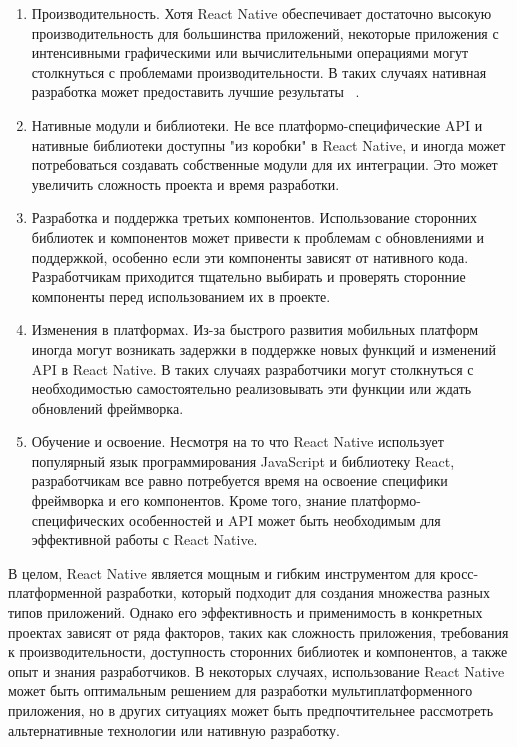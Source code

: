 \documentclass[14pt, russian]{scrartcl}
\begin{document}
\begin{enumerate}
    \item Производительность. Хотя React Native обеспечивает достаточно высокую производительность для большинства приложений, некоторые приложения с интенсивными графическими или вычислительными операциями могут столкнуться с проблемами производительности. В таких случаях нативная разработка может предоставить лучшие результаты ~\cite{Performance}.
    \item Нативные модули и библиотеки. Не все платформо-специфические API и нативные библиотеки доступны "из коробки"{} в React Native, и иногда может потребоваться создавать собственные модули для их интеграции. Это может увеличить сложность проекта и время разработки.
    \item Разработка и поддержка третьих компонентов. Использование сторонних библиотек и компонентов может привести к проблемам с обновлениями и поддержкой, особенно если эти компоненты зависят от нативного кода. Разработчикам приходится тщательно выбирать и проверять сторонние компоненты перед использованием их в проекте.
    \item Изменения в платформах. Из-за быстрого развития мобильных платформ иногда могут возникать задержки в поддержке новых функций и изменений API в React Native. В таких случаях разработчики могут столкнуться с необходимостью самостоятельно реализовывать эти функции или ждать обновлений фреймворка.
    \item Обучение и освоение. Несмотря на то что React Native использует популярный язык программирования JavaScript и библиотеку React, разработчикам все равно потребуется время на освоение специфики фреймворка и его компонентов. Кроме того, знание платформо-специфических особенностей и API может быть необходимым для эффективной работы с React Native.
\end{enumerate}

В целом, React Native является мощным и гибким инструментом для кросс-платформенной разработки, который подходит для создания множества разных типов приложений. Однако его эффективность и применимость в конкретных проектах зависят от ряда факторов, таких как сложность приложения, требования к производительности, доступность сторонних библиотек и компонентов, а также опыт и знания разработчиков. В некоторых случаях, использование React Native может быть оптимальным решением для разработки мультиплатформенного приложения, но в других ситуациях может быть предпочтительнее рассмотреть альтернативные технологии или нативную разработку.
\end{document}
